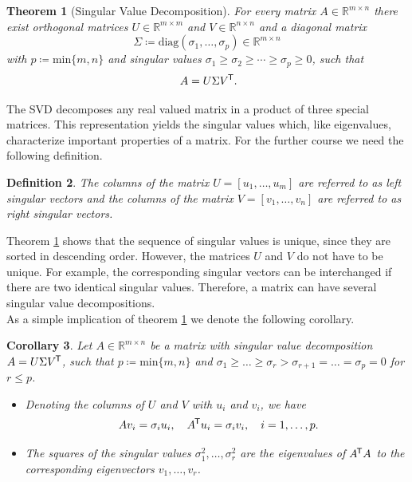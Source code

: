 \documentclass[11pt, a4paper]{article}
\newtheorem{theorem}{Theorem}[section]
\newtheorem{corollary}[theorem]{Corollary}
\newtheorem{definition}[theorem]{Definition}
\newcommand{\R}{\mathbb{R}}
\newcommand*{\tr}{^{\mkern-1.5mu\mathsf{T}}}
\begin{document}
\begin{theorem}[Singular Value Decomposition] \label{thm:svd}
For every matrix $A \in \R^{m \times n}$ there exist orthogonal matrices $U \in \R^{m \times m}$ and $V \in \R^{n \times n}$ and a diagonal matrix 
\[ \Sigma \coloneq \text{diag}(\sigma_1, \dots, \sigma_p) \in \R^{m \times n} \]
with $p \coloneq \text{min} \{ m,n \}$ and singular values $\sigma_1 \geq \sigma_2 \geq \cdots \geq \sigma_p \geq 0$, such that
\[ A = U \Sigma V\tr . \]
\end{theorem}

The SVD decomposes any real valued matrix in a product of three special matrices. This representation yields the singular values which, like eigenvalues, characterize important properties of a matrix. For the further course we need the following definition.

\begin{definition}
The columns of the matrix $U = [u_1, \dots, u_m]$ are referred to as left singular vectors and the columns of the matrix $V = [v_1, \dots, v_n]$ are referred to as right singular vectors.
\end{definition}

Theorem \ref{thm:svd} shows that the sequence of singular values is unique, since they are sorted in descending order. However, the matrices $U$ and $V$ do not have to be unique. For example, the corresponding singular vectors can be interchanged if there are two identical singular values. Therefore, a matrix can have several singular value decompositions. \\

As a simple implication of theorem \ref{thm:svd} we denote the following corollary.

\begin{corollary} \label{cor:svd}
Let $A \in \R^{m \times n}$ be a matrix with singular value decomposition $A=U \Sigma V\tr $, such that $p \coloneq \text{min}\{m,n\}$ and $\sigma_1 \geq \dots \geq \sigma_r > \sigma_{r+1} = \dots = \sigma_p = 0$ for $r \leq p$.
\begin{itemize}
\item[1.] Denoting the columns of $U$ and $V$ with $u_i$ and $v_i$, we have
\[ A v_i = \sigma_i u_i, \quad A\tr  u_i = \sigma_i v_i, \quad i=1,\dots,p.\]
\item[2.] The squares of the singular values $\sigma_1^2, \dots, \sigma_r^2$ are the eigenvalues of $A\tr A$ to the corresponding eigenvectors $v_1, \dots, v_r$.
\end{itemize}
\end{corollary}
\end{document}
